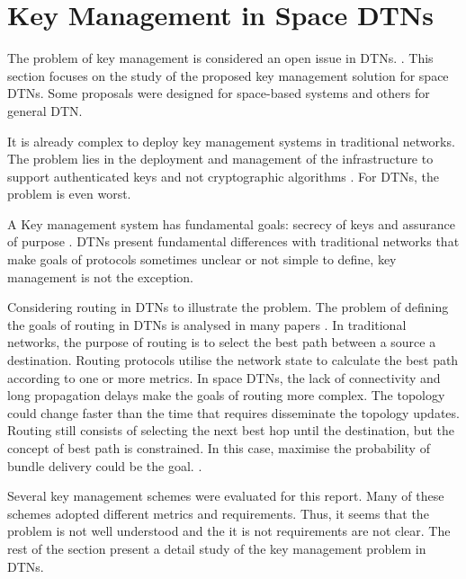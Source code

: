 \section{Key Management in Space DTNs}
\label{sec:survey}




The problem of key management is considered an open issue in DTNs. \cite{menesidou2016automated}.
This section focuses on the study of the proposed key management solution for space DTNs.  Some proposals were designed for space-based systems and others for general DTN.




It is already complex to deploy key management systems in traditional networks. The problem lies in the deployment and management of the infrastructure to support authenticated keys and not cryptographic algorithms \cite{al2003certificateless}. For DTNs, the problem is even worst.


A Key management system has fundamental goals: secrecy of keys and assurance of purpose \cite{martineveryday}.  DTNs present fundamental differences with traditional networks that make goals of protocols sometimes unclear or not simple to define, key management is not the exception.

Considering routing in DTNs to illustrate the problem. The problem of defining the goals of routing in DTNs is analysed in many papers \cite{ivancic2009security,fall2003delay,araniti2015contact}. In traditional networks, the purpose of routing is to select the best path between a source a destination. Routing protocols utilise the network state to calculate the best path according to one or more metrics. In space DTNs, the lack of connectivity and long propagation delays make the goals of routing more complex. The topology could change faster than the time that requires disseminate the topology updates. Routing still consists of selecting the next best hop until the destination, but the concept of best path is constrained. In this case, maximise the probability of bundle delivery could be the goal. \cite{araniti2015contact}. 


Several key management schemes were evaluated for this report. Many of these schemes adopted different metrics and requirements. Thus, it seems that the problem is not well understood and the it is not requirements are not clear. The rest of the section present a detail study of the key management problem in DTNs.

